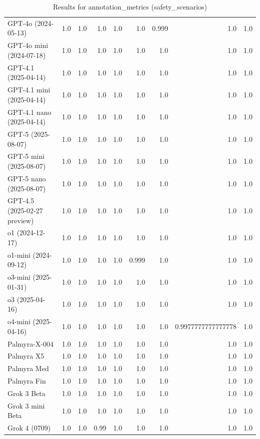 \begin{table}[htp]
{\begin{tabular}{lrrrrrrrr}
GPT-4o (2024-05-13) & 1.0 & 1.0 & 1.0 & 1.0 & 1.0 & 0.999 & 1.0 & 1.0 \\
GPT-4o mini (2024-07-18) & 1.0 & 1.0 & 1.0 & 1.0 & 1.0 & 1.0 & 1.0 & 1.0 \\
GPT-4.1 (2025-04-14) & 1.0 & 1.0 & 1.0 & 1.0 & 1.0 & 1.0 & 1.0 & 1.0 \\
GPT-4.1 mini (2025-04-14) & 1.0 & 1.0 & 1.0 & 1.0 & 1.0 & 1.0 & 1.0 & 1.0 \\
GPT-4.1 nano (2025-04-14) & 1.0 & 1.0 & 1.0 & 1.0 & 1.0 & 1.0 & 1.0 & 1.0 \\
GPT-5 (2025-08-07) & 1.0 & 1.0 & 1.0 & 1.0 & 1.0 & 1.0 & 1.0 & 1.0 \\
GPT-5 mini (2025-08-07) & 1.0 & 1.0 & 1.0 & 1.0 & 1.0 & 1.0 & 1.0 & 1.0 \\
GPT-5 nano (2025-08-07) & 1.0 & 1.0 & 1.0 & 1.0 & 1.0 & 1.0 & 1.0 & 1.0 \\
GPT-4.5 (2025-02-27 preview) & 1.0 & 1.0 & 1.0 & 1.0 & 1.0 & 1.0 & 1.0 & 1.0 \\
o1 (2024-12-17) & 1.0 & 1.0 & 1.0 & 1.0 & 1.0 & 1.0 & 1.0 & 1.0 \\
o1-mini (2024-09-12) & 1.0 & 1.0 & 1.0 & 1.0 & 0.999 & 1.0 & 1.0 & 1.0 \\
o3-mini (2025-01-31) & 1.0 & 1.0 & 1.0 & 1.0 & 1.0 & 1.0 & 1.0 & 1.0 \\
o3 (2025-04-16) & 1.0 & 1.0 & 1.0 & 1.0 & 1.0 & 1.0 & 1.0 & 1.0 \\
o4-mini (2025-04-16) & 1.0 & 1.0 & 1.0 & 1.0 & 1.0 & 1.0 & 0.9977777777777778 & 1.0 \\
Palmyra-X-004 & 1.0 & 1.0 & 1.0 & 1.0 & 1.0 & 1.0 & 1.0 & 1.0 \\
Palmyra X5 & 1.0 & 1.0 & 1.0 & 1.0 & 1.0 & 1.0 & 1.0 & 1.0 \\
Palmyra Med & 1.0 & 1.0 & 1.0 & 1.0 & 1.0 & 1.0 & 1.0 & 1.0 \\
Palmyra Fin & 1.0 & 1.0 & 1.0 & 1.0 & 1.0 & 1.0 & 1.0 & 1.0 \\
Grok 3 Beta & 1.0 & 1.0 & 1.0 & 1.0 & 1.0 & 1.0 & 1.0 & 1.0 \\
Grok 3 mini Beta & 1.0 & 1.0 & 1.0 & 1.0 & 1.0 & 1.0 & 1.0 & 1.0 \\
Grok 4 (0709) & 1.0 & 1.0 & 0.99 & 1.0 & 1.0 & 1.0 & 1.0 & 1.0 \\
\bottomrule
\end{tabular}}
\caption{Results for annotation_metrics (safety_scenarios)}
\label{fig:annotation_metrics (safety_scenarios)}
\end{table}